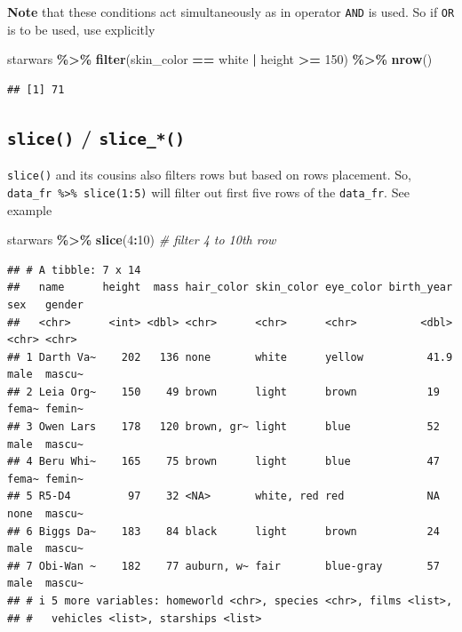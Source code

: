 \documentclass[
]{book}
\newenvironment{Shaded}{\begin{snugshade}}{\end{snugshade}}
\newcommand{\CommentTok}[1]{\textcolor[rgb]{0.56,0.35,0.01}{\textit{#1}}}
\newcommand{\DecValTok}[1]{\textcolor[rgb]{0.00,0.00,0.81}{#1}}
\newcommand{\FunctionTok}[1]{\textcolor[rgb]{0.13,0.29,0.53}{\textbf{#1}}}
\newcommand{\NormalTok}[1]{#1}
\newcommand{\SpecialCharTok}[1]{\textcolor[rgb]{0.81,0.36,0.00}{\textbf{#1}}}
\newcommand{\StringTok}[1]{\textcolor[rgb]{0.31,0.60,0.02}{#1}}
\begin{document}
\textbf{Note} that these conditions act simultaneously as in operator \texttt{AND} is used. So if \texttt{OR} is to be used, use \texttt{\textbar{}} explicitly

\begin{Shaded}
\begin{Highlighting}[]
\NormalTok{starwars }\SpecialCharTok{\%\textgreater{}\%} 
  \FunctionTok{filter}\NormalTok{(skin\_color }\SpecialCharTok{==} \StringTok{\textquotesingle{}white\textquotesingle{}} \SpecialCharTok{|}\NormalTok{ height }\SpecialCharTok{\textgreater{}=} \DecValTok{150}\NormalTok{) }\SpecialCharTok{\%\textgreater{}\%} 
  \FunctionTok{nrow}\NormalTok{()}
\end{Highlighting}
\end{Shaded}

\begin{verbatim}
## [1] 71
\end{verbatim}

\hypertarget{slice_func}{%
\subsection{\texorpdfstring{\texttt{slice()} / \texttt{slice\_*()}}{slice() / slice\_*()}}\label{slice_func}}

\texttt{slice()} and its cousins also filters rows but based on rows placement. So, \texttt{data\_fr\ \%\textgreater{}\%\ slice(1:5)} will filter out first five rows of the \texttt{data\_fr}. See example

\begin{Shaded}
\begin{Highlighting}[]
\NormalTok{starwars }\SpecialCharTok{\%\textgreater{}\%} 
  \FunctionTok{slice}\NormalTok{(}\DecValTok{4}\SpecialCharTok{:}\DecValTok{10}\NormalTok{) }\CommentTok{\# filter 4 to 10th row}
\end{Highlighting}
\end{Shaded}

\begin{verbatim}
## # A tibble: 7 x 14
##   name      height  mass hair_color skin_color eye_color birth_year sex   gender
##   <chr>      <int> <dbl> <chr>      <chr>      <chr>          <dbl> <chr> <chr> 
## 1 Darth Va~    202   136 none       white      yellow          41.9 male  mascu~
## 2 Leia Org~    150    49 brown      light      brown           19   fema~ femin~
## 3 Owen Lars    178   120 brown, gr~ light      blue            52   male  mascu~
## 4 Beru Whi~    165    75 brown      light      blue            47   fema~ femin~
## 5 R5-D4         97    32 <NA>       white, red red             NA   none  mascu~
## 6 Biggs Da~    183    84 black      light      brown           24   male  mascu~
## 7 Obi-Wan ~    182    77 auburn, w~ fair       blue-gray       57   male  mascu~
## # i 5 more variables: homeworld <chr>, species <chr>, films <list>,
## #   vehicles <list>, starships <list>
\end{verbatim}
\end{document}
